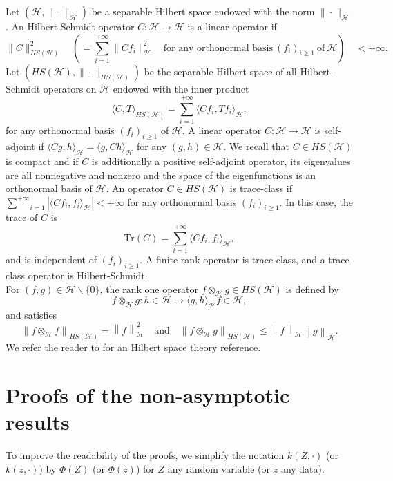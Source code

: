 \documentclass[twoside,11pt]{article}
\newcommand{\Hk}{\mathcal{H}}
\newcommand{\HSk}{HS(\mathcal{H})}
\begin{document}
Let $(\Hk,\|\cdot\|_{\Hk})$ be a separable Hilbert space endowed with the norm $\|\cdot\|_{\Hk}$. 
An Hilbert-Schmidt operator $C : \Hk \rightarrow \Hk$ is a linear operator if 
$$\|C\|^2_{\HSk} \quad (= \underset{i=1}{\overset{+ \infty}{\sum}} \|Cf_i\|^2_{\Hk} \quad \text{for any orthonormal basis} \ (f_i)_{i \geq 1} \ \text{of} \ \Hk) \quad < + \infty.$$ 
Let $(\HSk,\|\cdot\|_{\HSk})$ be the separable Hilbert space of all Hilbert-Schmidt operators on $\Hk$ endowed with the inner product 
 $$\langle C, T \rangle_{\HSk} = \underset{i=1}{\overset{+ \infty}{\sum}} \langle Cf_i, T f_i\rangle_{\Hk},$$ 
for any orthonormal basis $(f_i)_{i \geq 1}$ of $\Hk$. 
A linear operator $C : \Hk \rightarrow \Hk$ is self-adjoint if $\langle C g, h \rangle_{\Hk} = \langle g, Ch \rangle_{\Hk}$ for any $(g,h) \in \Hk$. 
We recall that $C \in \HSk$ is compact and if $C$ is additionally a positive self-adjoint operator, its eigenvalues are all nonnegative and nonzero and the space of the eigenfunctions is an orthonormal basis of $\Hk$.
An operator $C \in \HSk$ is trace-class if $\underset{i=1}{\overset{+ \infty}{\sum}} |\langle C f_i, f_i \rangle_{\Hk} | < + \infty$ for any orthonormal basis $(f_i)_{i \geq 1}$. In this case, the trace of $C$ is 
$$ \text{Tr}(C) = \underset{i=1}{\overset{+ \infty}{\sum}} \langle C f_i, f_i \rangle_{\Hk},$$ 
and is independent of $(f_i)_{i \geq 1}$. 
A finite rank operator is trace-class, and a trace-class operator is Hilbert-Schmidt. \\
For $(f,g) \in \Hk \backslash \{0\}$, the rank one operator $f \otimes_{\Hk} g \in \HSk$ is defined by 
\begin{equation}
     f \otimes_{\Hk} g : h \in \Hk \mapsto  \langle g , h \rangle_{\Hk}  f \in \Hk,
    \label{otimes_equality}
\end{equation}
and satisfies
\begin{equation}
    \left \| f \otimes_{\Hk} f \right \|_{\HSk} =  \left \| f \right \|^2_{\Hk} \quad \text{and} \quad \left \| f \otimes_{\Hk} g \right \|_{\HSk} \leq  \left \| f \right \|_{\Hk} \left \| g \right \|_{\Hk}.
    \label{norm_inequality}
\end{equation}
We refer the reader to \citep{dunford1963spectral} for an Hilbert space theory reference.
\section{Proofs of the non-asymptotic results}\label{la_section_proof}
To improve the readability of the proofs, we simplify the notation $k(Z,\cdot)$ (or $k(z,\cdot)$) by $\Phi(Z)$ (or $\Phi(z)$) for $Z$ any random variable (or $z$ any data). 
\end{document}
